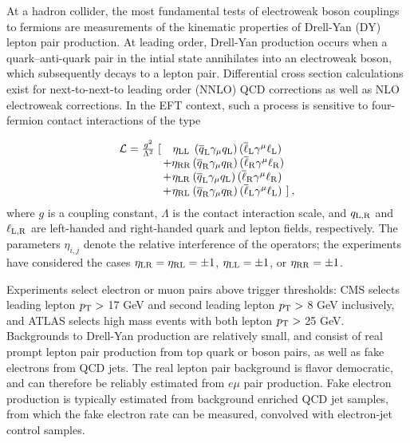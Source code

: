 At a hadron collider, the most fundamental tests of electroweak boson
couplings to fermions are measurements of the kinematic properties of
Drell-Yan (DY) lepton pair production.  At leading order, Drell-Yan
production occurs when a quark--anti-quark pair in the intial state
annihilates into an electroweak boson, which subsequently decays to a
lepton pair. Differential cross section calculations exist for
next-to-next-to leading order (NNLO) QCD corrections as well as NLO
electroweak corrections. In the EFT context, such a process is
sensitive to four-fermion contact interactions of the type

\begin{equation}\label{lagrangian}
\begin{array}{r@{\,}c@{}c@{\,}l@{\,}l}
\mathcal L = \frac{g^2}{\Lambda^2}\;[ && \eta_{\rm LL}&\, (\overline q_{\rm L}\gamma_{\mu} q_{\rm L})\,(\overline\ell_{\rm L}\gamma^{\mu}\ell_{\rm L}) \nonumber \\
& +&\eta_{\rm RR}& (\overline q_{\rm R}\gamma_{\mu} q_{\rm R}) \,(\overline\ell_{\rm R}\gamma^{\mu}\ell_{\rm R}) \\
&+&\eta_{\rm LR}& (\overline q_{\rm L}\gamma_{\mu} q_{\rm L}) \,(\overline\ell_{\rm R}\gamma^{\mu}\ell_{\rm R}) \\
&+&\eta_{\rm RL}& (\overline q_{\rm R}\gamma_{\mu} q_{\rm R}) \,(\overline\ell_{\rm L}\gamma^{\mu}\ell_{\rm L})& ] \: ,\nonumber
\end{array}
\end{equation}
where $g$ is a coupling constant, $\Lambda$ is the contact interaction scale,
and $q_{\rm L,R}$ and $\ell_{\rm L,R}$ are left-handed and right-handed quark and
lepton fields, respectively. The parameters $\eta_{i,j}$ denote the relative interference of the operators;
the experiments have considered the cases $\eta_{\rm LR} = \eta_{\rm RL} = \pm 1$,
$\eta_{\rm LL} = \pm 1$, or $\eta_{\rm RR} = \pm 1$.

Experiments select electron or muon pairs above trigger thresholds:
CMS selects leading lepton $p_{\mathrm{T}} >$ 17 GeV and second leading lepton
$p_{\mathrm{T}} >$ 8 GeV inclusively, and ATLAS selects high mass events with
both lepton $p_{\mathrm{T}} >$ 25 GeV.  Backgrounds to Drell-Yan production are
relatively small, and consist of real prompt lepton pair production
from top quark or boson pairs, as well as fake electrons from QCD
jets.  The real lepton pair background is flavor democratic, and can
therefore be reliably estimated from $e\mu$ pair production.  Fake
electron production is typically estimated from background enriched
QCD jet samples, from which the fake electron rate can be measured,
convolved with electron-jet control samples.

